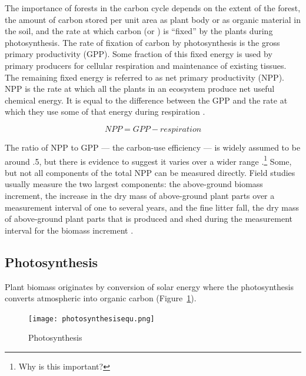 

The importance of forests in the carbon cycle depends on the extent of the forest, the amount of carbon stored per unit area as plant body or as organic material in the soil, and the rate at which carbon (or \CO) is ``fixed'' by the plants during photosynthesis. The rate of fixation of carbon by photosynthesis is the \gls{gross primary productivity} (GPP). Some fraction of this fixed energy is used by primary producers for cellular respiration and maintenance of existing tissues. The remaining fixed energy is referred to as \gls{net primary productivity} (NPP). NPP is the rate at which all the plants in an ecosystem produce net useful chemical energy. It is equal to the difference between the GPP and the rate at which they use some of that energy during respiration \citep{corlett2014ecology}. 

\begin{equation}
		NPP = GPP - respiration
\end{equation}

The ratio of NPP to GPP --- the carbon-use efficiency --- is widely assumed to be around .5, but there is evidence to suggest it varies over a wider range \citep{delucia2007forest}.\footnote{Why is this important?} Some, but not all components of the total NPP can be measured directly. Field studies usually measure the two largest components: the above-ground biomass increment, the increase in the dry mass of above-ground plant parts over a measurement interval of one to several years, and the fine litter fall, the dry mass of above-ground plant parts that is produced and shed during the measurement interval for the biomass increment \citep{ruimy1996turc}. 
  
\subsection{Photosynthesis}


Plant biomass originates by conversion of solar energy where the photosynthesis converts atmospheric \CO into organic carbon (Figure~\ref{fig:photosynthesis}).
 
   \begin{figure}[ht]
    \centering
        \texttt{[image: photosynthesisequ.png]}
				\caption{Photosynthesis}
				\label{fig:photosynthesis}
    \end{figure}
		
